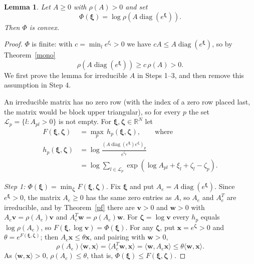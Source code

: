 \documentclass[11pt]{article}
\theoremstyle{plain}
\newtheorem{lemma}[theorem]{Lemma}
\theoremstyle{definition}
\theoremstyle{remark}
\numberwithin{equation}{section}
\numberwithin{figure}{section}
\numberwithin{table}{section}
\numberwithin{algorithm}{section}
\begin{document}
\begin{lemma}\label{log-convex}
Let $A\ge 0$ with $\rho(A)>0$ and set
\begin{equation}\label{phi-def}
\Phi(\bm\xi)=\log\rho\left(A\operatorname{diag}\left(e^{\bm\xi}\right)\right).
\end{equation}
Then $\Phi$ is convex.
\end{lemma}
\begin{proof}
$\Phi$ is finite: with $c=\min_l e^{\xi_l}>0$ we have
$cA\le A\operatorname{diag}\left(e^{\bm\xi}\right)$, so by Theorem~\ref{mono}
\begin{equation}
\rho\left(A\operatorname{diag}\left(e^{\bm\xi}\right)\right)\ge c\,\rho(A)>0.
\end{equation}
We first prove the lemma for irreducible $A$ in Steps 1--3, and then remove
this assumption in Step 4.

An irreducible matrix has no zero row (with the index of a zero row placed
last, the matrix would be block upper triangular), so for every $p$ the set
$\mathcal{L}_p=\{l:A_{pl}>0\}$ is not empty. For $\bm\xi,\bm\zeta\in\mathbb{R}^N$
let
\begin{equation}\label{cw-F}
\begin{aligned}
F(\bm\xi,\bm\zeta)&=\max_{p}\,h_p(\bm\xi,\bm\zeta),\qquad\mbox{where}\\
h_p(\bm\xi,\bm\zeta)&=\log\frac{\left(A\operatorname{diag}\left(e^{\bm\xi}\right)e^{\bm\zeta}\right)_p}{e^{\zeta_p}}\\
&=\log\sum_{l\in\mathcal{L}_p}\exp\left(\log A_{pl}+\xi_l+\zeta_l-\zeta_p\right).
\end{aligned}
\end{equation}

\emph{Step 1: $\Phi(\bm\xi)=\min_{\bm\zeta}F(\bm\xi,\bm\zeta)$.} Fix $\bm\xi$
and put $A_e=A\operatorname{diag}\left(e^{\bm\xi}\right)$. Since $e^{\bm\xi}>0$,
the matrix $A_e\ge 0$ has the same zero entries as $A$, so $A_e$ and $A_e^T$ are
irreducible, and by Theorem~\ref{pf} there are $\bm v>0$ and $\bm w>0$ with
$A_e\bm v=\rho(A_e)\bm v$ and $A_e^T\bm w=\rho(A_e)\bm w$. For $\bm\zeta=\log\bm v$
every $h_p$ equals $\log\rho(A_e)$, so $F(\bm\xi,\log\bm v)=\Phi(\bm\xi)$. For
any $\bm\zeta$, put $\bm x=e^{\bm\zeta}>0$ and $\theta=e^{F(\bm\xi,\bm\zeta)}$;
then $A_e\bm x\le\theta\bm x$, and pairing with $\bm w>0$,
\begin{equation}
\rho(A_e)\langle\bm w,\bm x\rangle=\langle A_e^T\bm w,\bm x\rangle
=\langle\bm w,A_e\bm x\rangle\le\theta\langle\bm w,\bm x\rangle .
\end{equation}
As $\langle\bm w,\bm x\rangle>0$, $\rho(A_e)\le\theta$, that is,
$\Phi(\bm\xi)\le F(\bm\xi,\bm\zeta)$.


\end{proof}
\end{document}
